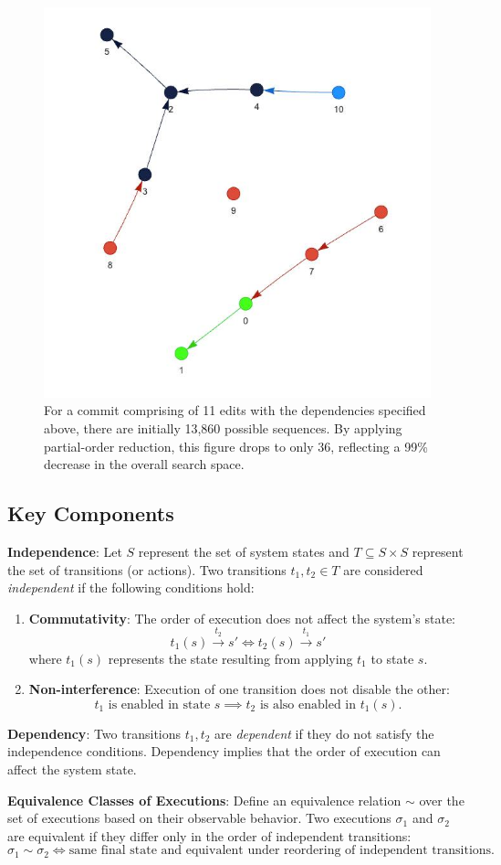 \begin{figure}[!htb]
    \centering
    \includegraphics[width=0.3\linewidth]{fig/partial-orders.png}
    \caption{For a commit comprising of 11 edits with the dependencies specified above, there are initially 13,860 possible sequences. By applying partial-order reduction, this figure drops to only 36, reflecting a 99\% decrease in the overall search space.}
    \label{fig:partial-order}
\end{figure}

\subsection{Key Components}

\textbf{Independence}: Let \( S \) represent the set of system states and \( T \subseteq S \times S \) represent the set of transitions (or actions). Two transitions \( t_1, t_2 \in T \) are considered \textit{independent} if the following conditions hold:
\begin{enumerate}
    \item \textbf{Commutativity}: The order of execution does not affect the system's state:
    \[
    t_1(s) \xrightarrow{t_2} s' \iff t_2(s) \xrightarrow{t_1} s'
    \]
    where \( t_1(s) \) represents the state resulting from applying \( t_1 \) to state \( s \).
    \item \textbf{Non-interference}: Execution of one transition does not disable the other:
    \[
    t_1 \text{ is enabled in state } s \implies t_2 \text{ is also enabled in } t_1(s).
    \]
\end{enumerate}

\textbf{Dependency}: Two transitions \( t_1, t_2 \) are \textit{dependent} if they do not satisfy the independence conditions. Dependency implies that the order of execution can affect the system state. 

\textbf{Equivalence Classes of Executions}: Define an equivalence relation \( \sim \) over the set of executions based on their observable behavior. Two executions \( \sigma_1 \) and \( \sigma_2 \) are equivalent if they differ only in the order of independent transitions:
\[
\sigma_1 \sim \sigma_2 \iff \text{same final state and equivalent under reordering of independent transitions.}
\]


